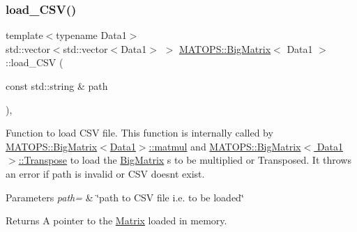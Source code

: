\subsubsection{\texorpdfstring{load\+\_\+\+C\+S\+V()}{load\_CSV()}}
{\footnotesize\ttfamily template$<$typename Data1$>$ \\
std\+::vector$<$std\+::vector$<$Data1$>$ $>$ \hyperlink{classMATOPS_1_1BigMatrix}{M\+A\+T\+O\+P\+S\+::\+Big\+Matrix}$<$ Data1 $>$\+::load\+\_\+\+C\+SV (\begin{DoxyParamCaption}\item[{const std\+::string \&}]{path }\end{DoxyParamCaption})\hspace{0.3cm}{\ttfamily [inline]}, {\ttfamily [private]}}



Function to load C\+SV file. This function is internally called by \hyperlink{classMATOPS_1_1BigMatrix_ac793236874a8ccfd66e21006011b9cff}{M\+A\+T\+O\+P\+S\+::\+Big\+Matrix$<$\+Data1$>$\+::matmul} and \hyperlink{classMATOPS_1_1BigMatrix_a3d3ca40bb701fbc884c6b603dd95e753}{M\+A\+T\+O\+P\+S\+::\+Big\+Matrix$<$ Data1 $>$\+::\+Transpose} to load the \hyperlink{classMATOPS_1_1BigMatrix}{Big\+Matrix} \textquotesingle{}s to be multiplied or Transposed. It throws an error if path is invalid or C\+SV doesn\textquotesingle{}t exist. 


\begin{DoxyParams}{Parameters}
{\em path=} & \char`\"{}path to C\+S\+V file i.\+e. to be loaded\char`\"{} \\
\hline
\end{DoxyParams}
\begin{DoxyReturn}{Returns}
A pointer to the \hyperlink{classMATOPS_1_1Matrix}{Matrix} loaded in memory. 
\end{DoxyReturn}

